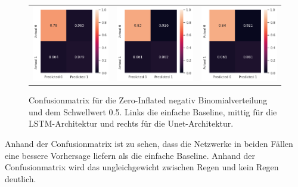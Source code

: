 \begin{figure}[h]
\begin{tabular}{ccc}
\includegraphics[width=45mm]{abb/simpleBaseLine.png}&
\includegraphics[width=45mm]{abb/znBinomConfusion_LSTM.png}&
\includegraphics[width=45mm]{abb/znBinomConfusion_UNET.png}
\end{tabular}
\caption{Confusionmatrix für die Zero-Inflated negativ Binomialverteilung und dem Schwellwert 0.5. Links die einfache Baseline, mittig für die LSTM-Architektur und rechts für die Unet-Architektur. \label{fig:confusionmatrix_binom}}
\end{figure}

\noindent Anhand der Confusionmatrix ist zu sehen, dass die Netzwerke in beiden Fällen eine bessere Vorhersage liefern als die einfache Baseline. 
Anhand der Confusionmatrix wird das ungleichgewicht zwischen Regen und kein Regen deutlich. 

